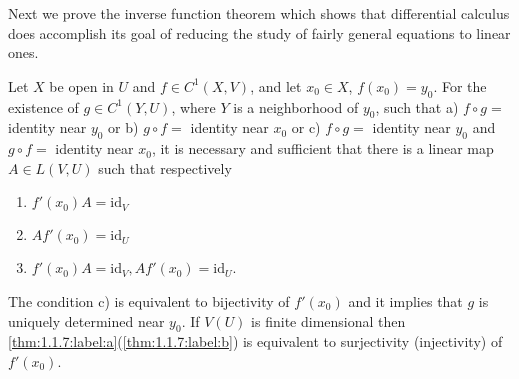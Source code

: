 Next we prove the inverse function theorem which shows that differential calculus does accomplish its goal of reducing the study of fairly general equations to linear ones.
\begin{theorem}
    Let $X$ be open in $U$ and $f \in C^{1}(X, V)$, and let $x_{0} \in X$, $f(x_0)=y_{0}$. For the existence of $g \in C^{1}(Y, U)$, where $Y$ is a neighborhood of $y_{0}$, such that a) $f \circ g=$ identity near $y_{0}$ or b) $g \circ f=$ identity near $x_{0}$ or c) $f \circ g=$ identity near $y_{0}$ and $g \circ f=$ identity near $x_{0}$, it is necessary and sufficient that there is a linear map $A \in L(V, U)$ such that respectively
\begin{enumerate}[label=\upshape\alph*)$'$]
    \item\label{thm:1.1.7:label:a} $f'(x_0) A=\mathrm{id}_{V}$
\item\label{thm:1.1.7:label:b} $A f'(x_0)=\mathrm{id}_{U}$
\item\label{thm:1.1.7:label:c} $f'(x_0) A=\mathrm{id}_{V}, A f'(x_0)=\mathrm{id}_{U}$.
\end{enumerate}

The condition c) is equivalent to bijectivity of $f'(x_{0})$ and it implies that $g$ is uniquely determined near $y_{0}$. If $V(U)$ is finite dimensional then \ref{thm:1.1.7:label:a}(\ref{thm:1.1.7:label:b}) is equivalent to surjectivity (injectivity) of $f'(x_{0})$.
\end{theorem}

